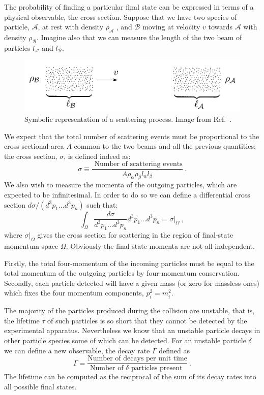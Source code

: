 \documentclass[../main/main.tex]{subfiles}
\begin{document}
The probability of finding a particular final state can be expressed in terms of a physical observable, the cross section.
Suppose that we have two species of particle, $\mathcal{A}$, at rest with density $\rho_\mathcal{A}$ , and $\mathcal{B}$ moving at velocity $v$ towards $\mathcal{A}$ with density $\rho_\mathcal{B}$. Imagine also that we can measure the length of the two beam of particles $l_\mathcal{A}$ and $l_\mathcal{B}$. 

\begin{figure}[h]
	\centering
	\includegraphics[width=12cm]{../images/peskin.png}
	\caption{Symbolic representation of a scattering process. Image from Ref.~\cite{Peskin:1995ev}.}
	\label{Potential}
\end{figure}

We expect that the total number of scattering events must be proportional to the cross-sectional area $A$ common to the two beams and all the previous quantities; the cross section, $\sigma$, is defined indeed as:
\begin{equation}
	\sigma \equiv \frac{\text{ Number of scattering events}}{A \rho_\alpha \rho_\beta  l_\alpha l_\beta} \ .
\end{equation}
We also wish to measure the momenta of the outgoing particles, which are expected to be infinitesimal. In order to do so we can define a differential cross section $ d \sigma/(d^3p_1...d^3p_n)$ such that:
\begin{equation}
	\int_\Omega \frac{ d \sigma}{d^3p_1...d^3p_n}d^3p_1...d^3p_n = \sigma|_\Omega \ ,
\end{equation}
where $\sigma|_\Omega$ gives the cross section for scattering in the region of final-state momentum space $\Omega$. Obviously the final state momenta are not all independent.

Firstly, the total four-momentum of the incoming particles must be equal to the total momentum of the outgoing particles by four-momentum conservation. Secondly, each particle detected will have a given mass (or zero for massless ones) which fixes the four momentum components, $p_i^2 = m_i^2$.

The majority of the particles produced during the collision are unstable, that is, the lifetime $\tau$ of 
such particles is so short that they cannot be detected by the experimental apparatus.
Nevertheless we know that an unstable particle decays in other particle species some of which can be detected. 
For an unstable particle $\delta$  we can define a new observable, the decay rate $\Gamma$ defined as 
\begin{equation}
	\Gamma = \frac{\text{Number of decays per unit time}}{\text{Number of  $\delta$  particles present }} \ .
\end{equation}
The lifetime can be computed as the reciprocal of the sum of its decay rates into all possible final states.
\end{document}
